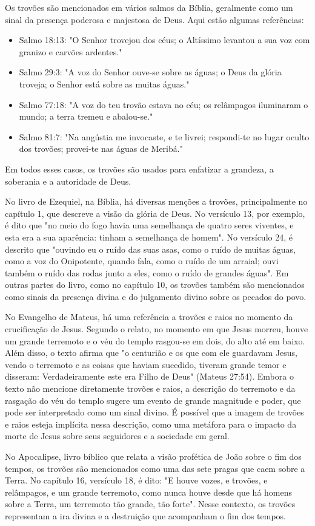\documentclass[a4paper, 12pt, onecolumn,singlespacing]{article}
\begin{document}
	Os trovões são mencionados em vários salmos da Bíblia, geralmente como um sinal da presença poderosa e majestosa de Deus. Aqui estão algumas referências:
	\begin{itemize}
		\item Salmo 18:13: "O Senhor trovejou dos céus; o Altíssimo levantou a sua voz com granizo e carvões ardentes."
		\item Salmo 29:3: "A voz do Senhor ouve-se sobre as águas; o Deus da glória troveja; o Senhor está sobre as muitas águas."
		\item Salmo 77:18: "A voz do teu trovão estava no céu; os relâmpagos iluminaram o mundo; a terra tremeu e abalou-se."
		\item Salmo 81:7: "Na angústia me invocaste, e te livrei; respondi-te no lugar oculto dos trovões; provei-te nas águas de Meribá."
	\end{itemize}

	
	Em todos esses casos, os trovões são usados para enfatizar a grandeza, a soberania e a autoridade de Deus.
	
	No livro de Ezequiel, na Bíblia, há diversas menções a trovões, principalmente no capítulo 1, que descreve a visão da glória de Deus. No versículo 13, por exemplo, é dito que "no meio do fogo havia uma semelhança de quatro seres viventes, e esta era a sua aparência: tinham a semelhança de homem". No versículo 24, é descrito que "ouvindo eu o ruído das suas asas, como o ruído de muitas águas, como a voz do Onipotente, quando fala, como o ruído de um arraial; ouvi também o ruído das rodas junto a eles, como o ruído de grandes águas". Em outras partes do livro, como no capítulo 10, os trovões também são mencionados como sinais da presença divina e do julgamento divino sobre os pecados do povo.
	
	No Evangelho de Mateus, há uma referência a trovões e raios no momento da crucificação de Jesus. Segundo o relato, no momento em que Jesus morreu, houve um grande terremoto e o véu do templo rasgou-se em dois, do alto até em baixo. Além disso, o texto afirma que "o centurião e os que com ele guardavam Jesus, vendo o terremoto e as coisas que haviam sucedido, tiveram grande temor e disseram: Verdadeiramente este era Filho de Deus" (Mateus 27:54).	Embora o texto não mencione diretamente trovões e raios, a descrição do terremoto e da rasgação do véu do templo sugere um evento de grande magnitude e poder, que pode ser interpretado como um sinal divino. É possível que a imagem de trovões e raios esteja implícita nessa descrição, como uma metáfora para o impacto da morte de Jesus sobre seus seguidores e a sociedade em geral.
	
	No Apocalipse, livro bíblico que relata a visão profética de João sobre o fim dos tempos, os trovões são mencionados como uma das sete pragas que caem sobre a Terra. No capítulo 16, versículo 18, é dito: "E houve vozes, e trovões, e relâmpagos, e um grande terremoto, como nunca houve desde que há homens sobre a Terra, um terremoto tão grande, tão forte". Nesse contexto, os trovões representam a ira divina e a destruição que acompanham o fim dos tempos.
	
\end{document}
